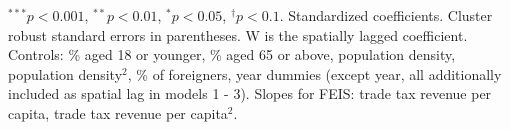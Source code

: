 \begin{table}[ht!]
{\begin{threeparttable}
\begin{center}
\begin{tabular}{l D{.}{.}{3.4} D{.}{.}{3.4} D{.}{.}{3.4} D{.}{.}{3.4} D{.}{.}{3.4} D{.}{.}{3.4}}
\hline
 \end{tabular}
 \begin{tablenotes}
 \item \scriptsize{$^{***}p<0.001$, $^{**}p<0.01$, $^*p<0.05$, $^{\dagger}p<0.1$. Standardized coefficients. Cluster robust standard errors in parentheses. W is the spatially lagged coefficient. Controls: \% aged 18 or younger, \% aged 65 or above, population density, population density$^2$, \% of foreigners, year dummies (except year, all additionally included as spatial lag in models 1 - 3). Slopes for FEIS: trade tax revenue per capita, trade tax revenue per capita$^2$.}
\end{tablenotes}
\label{tab:ranking}
\end{center}
\end{threeparttable}
}
\end{table} 

